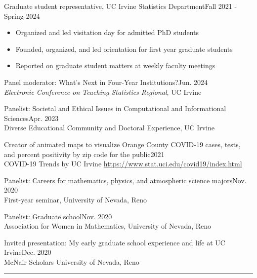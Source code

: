 \documentclass{article}
\begin{document}
	
	\newpage
	\begin{description}
		\vspace{-2mm}
		\item[Professional Service and Outreach]\hspace*{.1in} 
		
		Graduate student representative, UC Irvine Statistics Department\hfill{Fall 2021 - Spring 2024}
		\vspace*{-2mm}
		\begin{itemize}
			\item Organized and led visitation day for admitted PhD students
			\vspace*{-1mm}
			\item Founded, organized, and led orientation for first year graduate students
			\vspace*{-1mm}
			\item Reported on graduate student matters at weekly faculty meetings
			\vspace*{-1mm}
		\end{itemize}
		\vspace*{1mm}
		
		Panel moderator: What's Next in Four-Year Institutions?\hfill{Jun. 2024}\\
		\textit{Electronic Conference on Teaching Statistics Regional}, UC Irvine 
		\vspace*{1mm}
		
		Panelist: Societal and Ethical Issues in Computational and Informational Sciences\hfill{Apr. 2023}\\ 
		Diverse Educational Community and Doctoral Experience, UC Irvine
		\vspace*{1mm}
		
		Creator of animated maps to visualize Orange County COVID-19 cases, tests, and percent positivity by zip code for the public\hfill{2021}\\
		COVID-19 Trends by UC Irvine \url{https://www.stat.uci.edu/covid19/index.html}
		\vspace*{1mm}
		
		Panelist: Careers for mathematics, physics, and atmospheric science majors\hfill{Nov. 2020}\\
		First-year seminar, University of Nevada, Reno
		\vspace*{1mm}
		
		Panelist: Graduate school\hfill{Nov. 2020}\\
		Association for Women in Mathematics, University of Nevada, Reno
		\vspace*{1mm}
		
		Invited presentation: My early graduate school experience and life at UC Irvine\hfill{Dec. 2020}\\
		McNair Scholars University of Nevada, Reno
		
	\end{description}
	\vspace{-2mm}
	\rule{\linewidth}{1pt}
	
\end{document}
